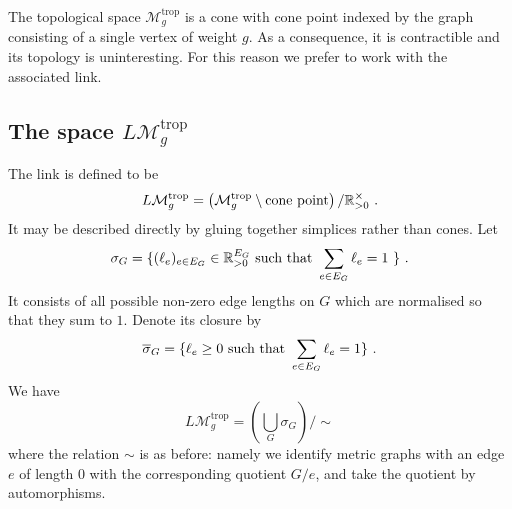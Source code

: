 \documentclass[12pt]{amsart}
\newcommand{\RR}{{\mathbb R}}
\theoremstyle{plain}
\newcommand{\LM}{L\mathcal{M}}
\newcommand{\trop}{\mathrm{trop}}
\newcommand{\0}{\color{blue}{\mathsf{0}}}
\begin{document}
The topological space $\mathcal{M}_g^{\trop}$ is a cone with cone point indexed by the graph consisting of a single vertex of weight $g$. As a consequence, it is contractible and its topology is uninteresting. For this reason we prefer to work with the associated link.
\subsection{The space $\LM_g^{\trop}$} The link is defined to be 
\[ \LM_g^{\trop}  = \left( \mathcal{M}_g^{\trop} \setminus \hbox{cone point}\right) / \RR^{\times}_{>0} \ .   \]  
It may be described directly by gluing together simplices rather than cones. Let 
\[ \sigma_G = \{ (\ell_e)_{e\in E_G} \in \RR_{>0}^{E_G} \hbox{ such that } \sum_{e \in E_G} \ell_e = 1\  \} \ .  \] 
It consists of all possible non-zero edge lengths on $G$ which are normalised so that they sum to $1$.
Denote its closure by 
\[ \overline{\sigma}_G =    \{  \ell_e \geq 0  \hbox{ such that } \sum_{e \in E_G} \ell_e = 1\} \ .  \] 
We have
\[ \LM_g^{\trop} =  \left( \bigcup_{G} \sigma_G \right) / \sim \] 
where the relation $\sim$ is as before: namely we identify metric  graphs with an edge $e$ of length $0$ with the corresponding quotient $G/e$, and take the  quotient by automorphisms. 
\end{document}
